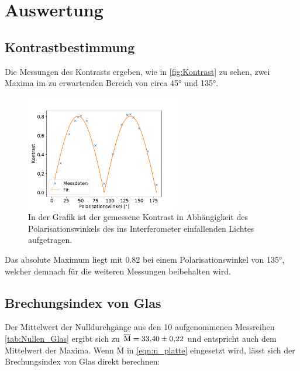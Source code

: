\newpage
\section{Auswertung}

    \subsection{Kontrastbestimmung}
        Die Messungen des Kontrasts ergeben, wie in \autoref{fig:Kontrast} zu sehen, zwei Maxima im zu erwartenden Bereich von circa 45° und 135°.
        
        \FloatBarrier

        \begin{figure}[h]
          \centering
          \includegraphics[width = 0.6\textwidth]{pictures/Kontrast.pdf}
          \caption{In der Grafik ist der gemessene Kontrast in Abhängigkeit des Polarisationswinkels des ins Interferometer einfallenden Lichtes aufgetragen.}
          \label{fig:Kontrast}
        \end{figure}

        \FloatBarrier

        Das absolute Maximum liegt mit \num{0.82} bei einem Polarisationswinkel von 135°, welcher demnach für die weiteren Messungen beibehalten wird.



    \subsection{Brechungsindex von Glas}
        Der Mittelwert der Nulldurchgänge aus den 10 aufgenommenen Messreihen \autoref{tab:Nullen_Glas} ergibt sich zu $\overline{\text{M}} = \num{33.40 +- 0.22}$ und entspricht auch dem Mittelwert der Maxima.
        Wenn $\overline{\text{M}}$ in \eqref{eqn:n_platte} eingesetzt wird, lässt sich der Brechungsindex von Glas direkt berechnen:

